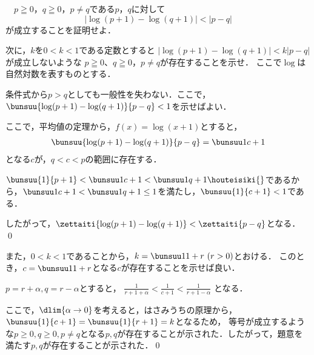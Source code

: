 \begin{problem}
  　$p\geqq0$，$q\geqq0$，$p \neq q$である$p$，$q$に対して
\[ |\log(p+1)-\log(q+1)|<|p-q| \]
が成立することを証明せよ．

次に，$k$を$0<k<1$である定数とすると
$|\log(p+1)-\log(q+1)|<k|p-q|$が成立しないような
$p\geqq0$、$q\geqq0$，$p \neq q$が存在することを示せ．
ここで$\log$は自然対数を表すものとする．
\end{problem}




条件式から$p>q$としても一般性を失わない．ここで，
$\bunsuu{\log(p+1) - \log(q+1)}{p-q} < 1$を示せばよい．

ここで，平均値の定理から，$f(x) = \log(x+1)$とすると，
\begin{align}
\bunsuu{\log(p+1) - \log(q+1)}{p-q} = \bunsuu1{c+1} \label{197441}
\end{align}
となる$c$が，$q < c < p$の範囲に存在する．

$\bunsuu{1}{p+1} < \bunsuu1{c+1} < \bunsuu1{q+1} \houteisiki{\label{197442}}$であるから，$\bunsuu1{c+1} < \bunsuu1{q+1} \leq 1$を満たし，$\bunsuu{1}{c+1} < 1$である．

したがって，$\zettaiti{\log(p+1) - \log(q+1)} < \zettaiti{p-q}$となる．
\qed

また，$0 < k < 1$であることから，$k = \bunsuu1{1+r}\ (r>0)$とおける．
このとき，$c = \bunsuu1{1+r}$となる$c$が存在することを示せば良い．

$p = r + \alpha, q = r - \alpha$とすると，
$\frac{1}{r+1+\alpha} < \frac{1}{c+1} < \frac{1}{r+1-\alpha}$
となる．

ここで，$\dlim{\alpha \to 0}$を考えると，はさみうちの原理から，
$\bunsuu{1}{c+1} = \bunsuu{1}{r+1} = k$となるため，
等号が成立するような$p \geq 0, q \geq 0, p \neq q$となる$p,q$が存在することが示された．したがって，題意を満たす$p,q$が存在することが示された．\qed
